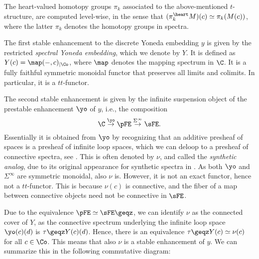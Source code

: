 \begin{remark}
    The heart-valued homotopy groups $\pi_k$ associated to the above-mentioned $t$-structure, are computed level-wise, in the sense that $(\pi^\heart_k M)(c)\simeq \pi_k (M(c))$, where the latter $\pi_k$ denotes the homotopy groups in spectra. 
\end{remark}

The first stable enhancement to the discrete Yoneda embedding $y$ is given by the restricted \emph{spectral Yoneda embedding}, which we denote by $Y$. It is defined as $Y(c) = \map(-,c)_{\mid \Co}$, where $\map$ denotes the mapping spectrum in $\C$. It is a fully faithful symmetric monoidal functor that preserves all limits and colimits. In particular, it is a $tt$-functor. 

The second stable enhancement is given by the infinite suspension object of the prestable enhancement $\yo$ of $y$, i.e., the composition
\[\C \overset{\yo}\to \pFE \overset{\Sigma^\infty}\to \sFE.\]
Essentially it is obtained from $\yo$ by recognizing that an additive presheaf of spaces is a presheaf of infinite loop spaces, which we can deloop to a presheaf of connective spectra, see \cite[2.20]{pstragowski_2022}. This is often denoted by $\nu$, and called the \emph{synthetic analog}, due to its original appearance for synthetic spectra in \cite{pstragowski_2022}. As both $\yo$ and $\Sigma^\infty$ are symmetric monoidal, also $\nu$ is. However, it is not an exact functor, hence not a $tt$-functor. This is because $\nu (c)$ is connective, and the fiber of a map between connective objects need not be connective in $\sFE$. 

\begin{remark}
    \label{rm:nu-is-connected-cover-of-Y}
    Due to the equivalence $\pFE \simeq \sFE\geqz$, we can identify $\nu$ as the connected cover of $Y$, as the connective spectrum underlying the infinite loop space $\yo(c)(d)$ is $\tau\geqz Y(c)(d)$. Hence, there is an equivalence $\tau\geqz Y(c)\simeq \nu(c)$ for all $c\in \Co$. This means that also $\nu$ is a stable enhancement of $y$. We can summarize this in the following commutative diagram:
    \begin{center}
    \end{center}
\end{remark}

